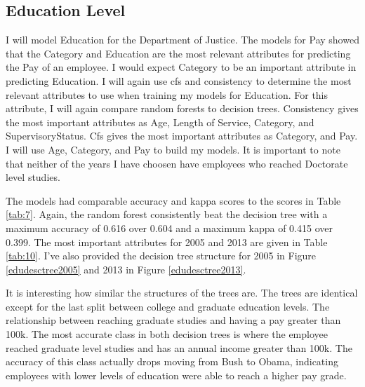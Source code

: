 \documentclass{article}
\begin{document}
    \subsection{Education Level}
    I will model Education for the Department of Justice. The models for Pay showed that the Category and Education are the most relevant attributes for predicting the Pay of an employee. I would expect Category to be an important attribute in predicting Education. I will again use cfs and consistency to determine the most relevant attributes to use when training my models for Education. For this attribute, I will again compare random forests to decision trees. Consistency gives the most important attributes as Age, Length of Service, Category, and SupervisoryStatus. Cfs gives the most important attributes as Category, and Pay. I will use Age, Category, and Pay to build my models. It is important to note that neither of the years I have choosen have employees who reached Doctorate level studies.
    \par
    The models had comparable accuracy and kappa scores to the scores in Table \ref{tab:7}. Again, the random forest consistently beat the decision tree with a maximum accuracy of 0.616 over 0.604 and a maximum kappa of 0.415 over 0.399. The most important attributes for 2005 and 2013 are given in Table \ref{tab:10}. I've also provided the decision tree structure for 2005 in Figure \ref{edudesctree2005} and 2013 in Figure \ref{edudesctree2013}.
    \par
    It is interesting how similar the structures of the trees are. The trees are identical except for the last split between college and graduate education levels. The relationship between reaching graduate studies and having a pay greater than 100k. The most accurate class in both decision trees is where the employee reached graduate level studies and has an annual income greater than 100k. The accuracy of this class actually drops moving from Bush to Obama, indicating employees with lower levels of education were able to reach a higher pay grade.
\end{document}
